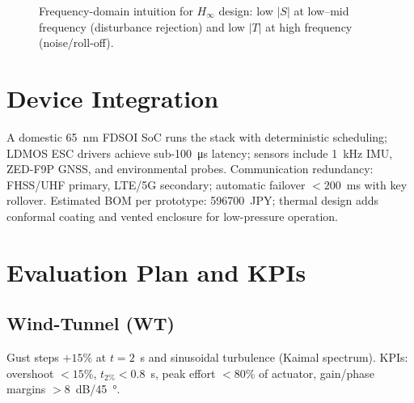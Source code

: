 \documentclass[conference]{IEEEtran}
\begin{document}
\begin{figure}[t]
\centering
{}
\caption{Frequency-domain intuition for $H_\infty$ design: low $|S|$ at low--mid frequency (disturbance rejection) and low $|T|$ at high frequency (noise/roll-off).}
\label{fig:weights}
\end{figure}

\section{Device Integration}
A domestic \SI{65}{nm} FDSOI SoC runs the stack with deterministic scheduling; LDMOS ESC drivers achieve sub-\SI{100}{\micro\second} latency; sensors include 1~kHz IMU, ZED-F9P GNSS, and environmental probes. Communication redundancy: FHSS/UHF primary, LTE/5G secondary; automatic failover $<200$~ms with key rollover. Estimated BOM per prototype: \SI{596700}{JPY}; thermal design adds conformal coating and vented enclosure for low-pressure operation.

\section{Evaluation Plan and KPIs}
\subsection{Wind-Tunnel (WT)}
Gust steps $+15\%$ at $t=2$~s and sinusoidal turbulence (Kaimal spectrum). KPIs: overshoot $<15\%$, $t_{2\%}<0.8$~s, peak effort $<80\%$ of actuator, gain/phase margins $>8$~dB/\SI{45}{\degree}.
\end{document}
